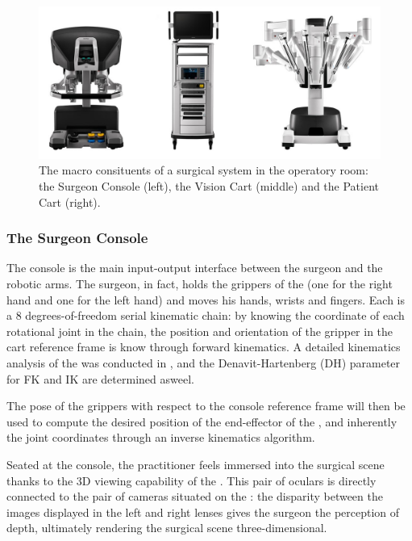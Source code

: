 \documentclass[../main.tex]{subfiles}
\begin{document}
\begin{figure}[h!]
    \centering
    \includegraphics[width=\textwidth]{images/davinci_system.jpg}
    \caption{The macro consituents of a \davinci surgical system in the operatory room: the Surgeon Console (left), the Vision Cart (middle) and the Patient Cart (right).}
    \label{fig:davincisystem}
\end{figure}

\subsubsection{The Surgeon Console}
The console is the main input-output interface between the surgeon and the robotic arms. The surgeon, in fact, holds the grippers of the \mtms (one for the right hand and one for the left hand) and moves his hands, wrists and fingers. Each \mtm is a 8 degrees-of-freedom serial kinematic chain: by knowing the coordinate of each rotational joint in the chain, the position and orientation of the gripper in the cart reference frame is know through forward kinematics. A detailed kinematics analysis of the \davinci was conducted in \cite{Fontanelli2017}, and the Denavit-Hartenberg (DH) parameter for FK and IK are determined asweel. 

The pose of the \mtms grippers with respect to the console reference frame will then be used to compute the desired position of the end-effector of the \psms, and inherently the joint coordinates through an inverse kinematics algorithm.

Seated at the console, the practitioner feels immersed into the surgical scene thanks to the 3D viewing capability of the \hrsv. This pair of oculars is directly connected to the pair of cameras situated on the \ecm: the disparity between the images displayed in the left and right lenses gives the surgeon the perception of depth, ultimately rendering the surgical scene three-dimensional. 
\end{document}
